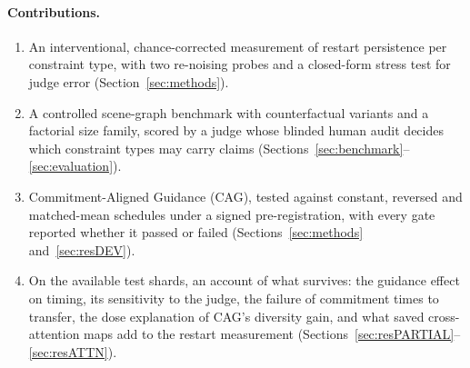 \paragraph{Contributions.}
\begin{enumerate}
\item[(i)] An interventional, chance-corrected measurement of restart persistence per constraint type, with two re-noising probes and a closed-form stress test for judge error (Section~\ref{sec:methods}).
\item[(ii)] A controlled scene-graph benchmark with counterfactual variants and a factorial size family, scored by a judge whose blinded human audit decides which constraint types may carry claims (Sections~\ref{sec:benchmark}--\ref{sec:evaluation}).
\item[(iii)] Commitment-Aligned Guidance (CAG), tested against constant, reversed and matched-mean schedules under a signed pre-registration, with every gate reported whether it passed or failed (Sections~\ref{sec:methods} and~\ref{sec:resDEV}).
\item[(iv)] On the available test shards, an account of what survives: the guidance effect on timing, its sensitivity to the judge, the failure of commitment times to transfer, the dose explanation of CAG's diversity gain, and what saved cross-attention maps add to the restart measurement (Sections~\ref{sec:resPARTIAL}--\ref{sec:resATTN}).
\end{enumerate}


